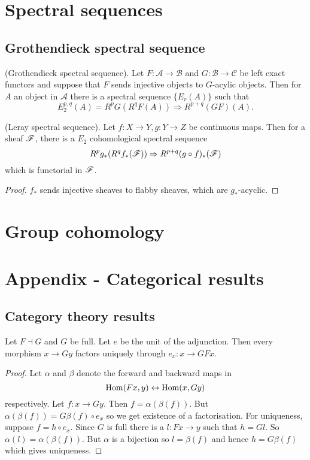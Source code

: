 \documentclass{memoir}
\begin{document}
\chapter{Spectral sequences}
\section{Grothendieck spectral sequence}
\begin{thm}
    (Grothendieck spectral sequence).
    Let $F:\mathcal A \to \mathcal B$ and $G:\mathcal B \to \mathcal C$ be left exact functors and suppose that $F$ sends injective objects to $G$-acylic objects.
    Then for $A$ an object in $\mathcal A$ there is a spectral sequence $\{E_r(A)\}$ such that 
    \begin{equation}
        E_2^{p,q}(A) = R^pG(R^qF(A)) \Rightarrow R^{p+q}(GF)(A).
    \end{equation}
\end{thm}
\begin{corollary}
    (Leray spectral sequence).
    Let $f:X\to Y, g:Y\to Z$ be continuous maps.
    Then for a sheaf $\mathscr{F}$, there is a $E_2$ cohomological spectral sequence
    \begin{equation}
        R^pg_*(R^qf_*(\mathscr{F})) \Rightarrow R^{p+q}(g\circ f)_*(\mathscr{F})
    \end{equation}
    which is functorial in $\mathscr{F}$.
\end{corollary}
\begin{proof}
    $f_*$ sends injective sheaves to flabby sheaves, which are $g_*$-acyclic.
\end{proof}
\chapter{Group cohomology}

\chapter{Appendix - Categorical results}
\section{Category theory results}
\begin{proposition}
    \label{prop:cat_factor}
    Let $F\dashv G$ and $G$ be full.
    Let $e$ be the unit of the adjunction.
    Then every morphism $x\to Gy$ factors uniquely through $e_x:x\to GFx$.
\end{proposition}
\begin{proof}
    Let $\alpha$ and $\beta$ denote the forward and backward maps in
    \begin{equation}
        \operatorname{Hom}(Fx,y) \leftrightarrow \operatorname{Hom}(x,Gy)
    \end{equation}
    respectively.
    Let $f:x\to Gy$.
    Then $f = \alpha(\beta(f))$.
    But $\alpha(\beta(f)) = G\beta(f)\circ e_x$ so we get existence of a factorisation.
    For uniqueness, suppose $f = h\circ e_x$.
    Since $G$ is full there is a $l:Fx\to y$ such that $h = Gl$.
    So $\alpha(l) = \alpha(\beta(f))$.
    But $\alpha$ is a bijection so $l = \beta(f)$ and hence $h = G\beta(f)$ which gives uniqueness.
\end{proof}
\end{document}
